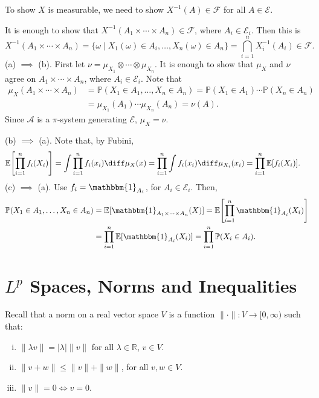 \documentclass[12pt]{article}
\begin{document}
\begin{proofbox}
	To show $X$ is measurable, we need to show $X^{-1}(A) \in \mathcal{F}$ for all $A \in \mathcal{E}$.

	It is enough to show that $X^{-1}(A_1 \times \cdots \times A_n) \in \mathcal{F}$, where $A_i \in \mathcal{E}_i$. Then this is
	\[
		X^{-1}(A_1 \times \cdots \times A_n) = \{\omega \mid X_1(\omega) \in A_i, \ldots, X_n(\omega) \in A_n\} = \bigcap_{i = 1}^{n} X_i^{-1}(A_i) \in \mathcal{F}.
	\]
	(a) $\implies$ (b). First let $\nu = \mu_{X_1} \otimes \cdots \otimes \mu_{X_n}$. It is enough to show that $\mu_X$ and $\nu$ agree on $A_1 \times \cdots \times A_n$, where $A_i \in \mathcal{E}_i$. Note that
	\begin{align*}
		\mu_X(A_1 \times \cdots \times A_n) &= \mathbb{P}(X_1 \in A_1, \ldots, X_n \in A_n) = \mathbb{P}(X_1 \in A_1) \cdots \mathbb{P}(X_n \in A_n) \\
						    &= \mu_{X_1}(A_1) \cdots \mu_{X_n}(A_n) = \nu(A).
	\end{align*}
	Since $\mathcal{A}$ is a $\pi$-system generating $\mathcal{E}$, $\mu_X = \nu$.

	(b) $\implies$ (a). Note that, by Fubini,
	\begin{align*}
		\mathbb{E}\Biggl[ \prod_{i = 1}^{n} f_i(X_i) \Biggr] &= \int \prod_{i = 1}^{n} f_i(x_i) \diff \mu_X(x) = \prod_{i = 1}^{n} \int f_i (x_i) \diff \mu_{X_i}(x_i) = \prod_{i = 1}^{n} \mathbb{E}[f_i(X_i)].
	\end{align*}
	(c) $\implies$ (a). Use $f_i = \mathbbm{1}_{A_i}$, for $A_i \in \mathcal{E}_i$. Then,
	\begin{align*}
		\mathbb{P}(X_1 \in A_1, \ldots, X_n \in A_n) &= \mathbb{E}[\mathbbm{1}_{A_1 \times \cdots \times A_n}(X)] = \mathbb{E}\Biggl[ \prod_{i = 1}^{n} \mathbbm{1}_{A_i}(X_i) \Biggr] \\
							     &= \prod_{i = 1}^{n} \mathbb{E}[\mathbbm{1}_{A_i}(X_i)] = \prod_{i = 1}^{n} \mathbb{P}(X_i \in A_i).
	\end{align*}
\end{proofbox}

\newpage

\section{\texorpdfstring{$L^p$}{L^p} Spaces, Norms and Inequalities}
\label{sec:lp_spaces}

Recall that a norm on a real vector space $V$ is a function $\|\cdot\| : V \to [0, \infty)$ such that:
\begin{enumerate}[(i)]
	\item $\|\lambda v\| = |\lambda| \|v\|$ for all $\lambda \in \mathbb{R}$, $v \in V$.
	\item $\|v+w\| \leq \|v\|+\|w\|$, for all $v, w \in V$.
	\item $\|v\| = 0 \iff v = 0$.
\end{enumerate}
\end{document}
